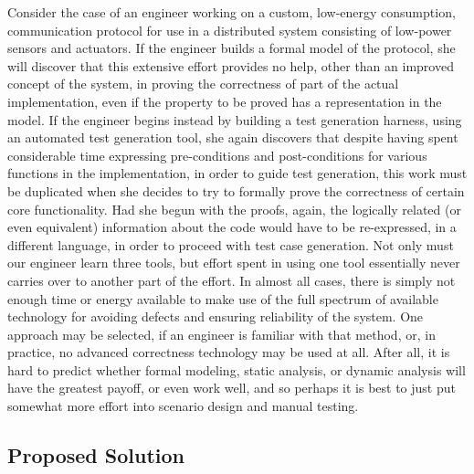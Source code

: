 Consider the case of an engineer working on a custom, low-energy consumption, communication protocol for use in a distributed system consisting of low-power sensors and actuators.  If the engineer builds a formal model of the protocol, she will discover that this extensive effort provides no help, other than an improved concept of the system, in proving the correctness of part of the actual implementation, even if the property to be proved has a representation in the model.  If the engineer begins instead by building a test generation harness, using an automated test generation tool, she again discovers that despite having spent considerable time expressing pre-conditions and post-conditions for various functions in the implementation, in order to guide test generation, this work must be duplicated when she decides to try to formally prove the correctness of certain core functionality.  Had she begun with the proofs, again, the logically related (or even equivalent) information about the code would have to be re-expressed, in a different language, in order to proceed with test case generation.  Not only must our engineer learn three tools, but effort spent in using one tool essentially never carries over to another part of the effort.  In almost all cases, there is simply not enough time or energy available to make use of the full spectrum of available technology for avoiding defects and ensuring reliability of the system.  One approach may be selected, if an engineer is familiar with that method, or, in practice, no advanced correctness technology may be used at all.  After all, it is hard to predict whether formal modeling, static analysis, or dynamic analysis will have the greatest payoff, or even work well, and so perhaps it is best to just put somewhat more effort into scenario design and manual testing.

\subsection{Proposed Solution}

